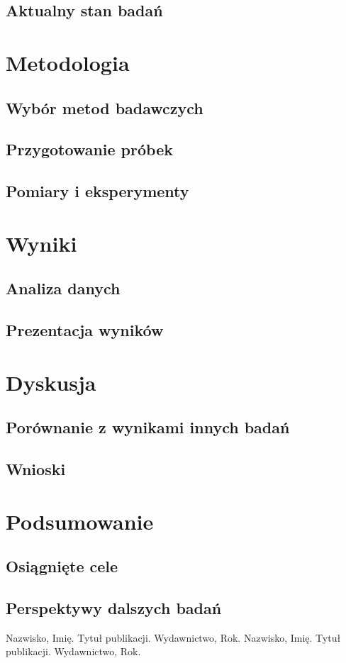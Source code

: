 \documentclass{report}
\begin{document}
	\section{Aktualny stan badań}
	
	\chapter{Metodologia}
	\section{Wybór metod badawczych}
	\section{Przygotowanie próbek}
	\section{Pomiary i eksperymenty}
	
	\chapter{Wyniki}
	\section{Analiza danych}
	\section{Prezentacja wyników}
	
	\chapter{Dyskusja}
	\section{Porównanie z wynikami innych badań}
	\section{Wnioski}
	
	\chapter{Podsumowanie}
	\section{Osiągnięte cele}
		\section{Perspektywy dalszych badań}
	
	
	

	
	
	\begin{thebibliography}{99}
		 Nazwisko, Imię. Tytuł publikacji. Wydawnictwo, Rok.
		 Nazwisko, Imię. Tytuł publikacji. Wydawnictwo, Rok.
	\end{thebibliography}
	
\end{document}
